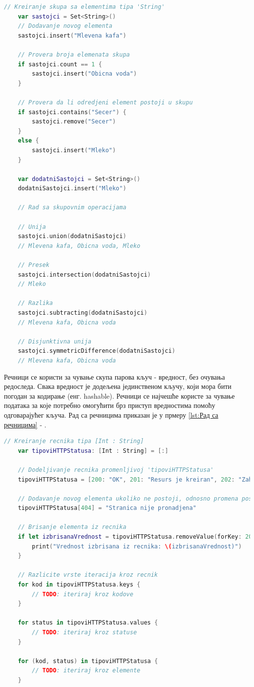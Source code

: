 \documentclass[12pt,oneside]{memoir}
\begin{document}
\begin{lstlisting}[caption=\textit{{Рад са скуповима}}, label={lst:Рад са скуповима}, language=Swift, frame=single]
    // Kreiranje skupa sa elementima tipa 'String'
    var sastojci = Set<String>()
    // Dodavanje novog elementa
    sastojci.insert("Mlevena kafa")
    
    // Provera broja elemenata skupa
    if sastojci.count == 1 {
        sastojci.insert("Obicna voda")
    }
    
    // Provera da li odredjeni element postoji u skupu
    if sastojci.contains("Secer") {
        sastojci.remove("Secer")
    }
    else {
        sastojci.insert("Mleko")
    }
    
    var dodatniSastojci = Set<String>()
    dodatniSastojci.insert("Mleko")
    
    // Rad sa skupovnim operacijama
    
    // Unija
    sastojci.union(dodatniSastojci)
    // Mlevena kafa, Obicna voda, Mleko
    
    // Presek
    sastojci.intersection(dodatniSastojci)
    // Mleko
    
    // Razlika
    sastojci.subtracting(dodatniSastojci)
    // Mlevena kafa, Obicna voda
    
    // Disjunktivna unija
    sastojci.symmetricDifference(dodatniSastojci)
    // Mlevena kafa, Obicna voda
\end{lstlisting}

\indent Речници се користи за чување скупа парова кључ - вредност, без очувања редоследа. Свака вредност је додељена јединственом кључу, који мора бити погодан за кодирање (енг. hashable). Речници се најчешће користе за чување података за које потребно омогућити брз приступ вредностима помоћу одговарајућег кључа. Рад са речницима приказан је у прмеру \ref{lst:Рад са речницима} - .

\begin{lstlisting}[caption=\textit{{Рад са речницима}}, label={lst:Рад са речницима}, language=Swift, frame=single]
    // Kreiranje recnika tipa [Int : String]
    var tipoviHTTPStatusa: [Int : String] = [:]
    
    // Dodeljivanje recnika promenljivoj 'tipoviHTTPStatusa'
    tipoviHTTPStatusa = [200: "OK", 201: "Resurs je kreiran", 202: "Zahtev je prihvacen"]
    
    // Dodavanje novog elementa ukoliko ne postoji, odnosno promena postojeceg
    tipoviHTTPStatusa[404] = "Stranica nije pronadjena"
    
    // Brisanje elementa iz recnika
    if let izbrisanaVrednost = tipoviHTTPStatusa.removeValue(forKey: 201) {
        print("Vrednost izbrisana iz recnika: \(izbrisanaVrednost)")
    }
    
    // Razlicite vrste iteracija kroz recnik
    for kod in tipoviHTTPStatusa.keys {
        // TODO: iteriraj kroz kodove
    }
    
    for status in tipoviHTTPStatusa.values {
        // TODO: iteriraj kroz statuse
    }

    for (kod, status) in tipoviHTTPStatusa {
        // TODO: iteriraj kroz elemente
    }
\end{lstlisting}
\end{document}
